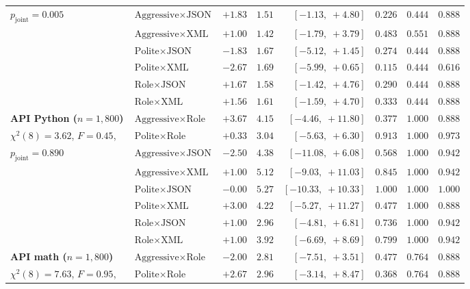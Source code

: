 \documentclass[a4paper,fleqn]{cas-sc}
\begin{document}
\begin{table}[htbp]
\begin{tabular}{@{}llrrrrrr@{}}
$p_{\text{joint}} = 0.005$ & $\text{Aggressive} \times \text{JSON}$ & $+1.83$ & $1.51$ & $[-1.13,\; +4.80]$ & $0.226$ & $0.444$ & $0.888$ \\
 & $\text{Aggressive} \times \text{XML}$ & $+1.00$ & $1.42$ & $[-1.79,\; +3.79]$ & $0.483$ & $0.551$ & $0.888$ \\
 & $\text{Polite} \times \text{JSON}$ & $-1.83$ & $1.67$ & $[-5.12,\; +1.45]$ & $0.274$ & $0.444$ & $0.888$ \\
 & $\text{Polite} \times \text{XML}$ & $-2.67$ & $1.69$ & $[-5.99,\; +0.65]$ & $0.115$ & $0.444$ & $0.616$ \\
 & $\text{Role} \times \text{JSON}$ & $+1.67$ & $1.58$ & $[-1.42,\; +4.76]$ & $0.290$ & $0.444$ & $0.888$ \\
 & $\text{Role} \times \text{XML}$ & $+1.56$ & $1.61$ & $[-1.59,\; +4.70]$ & $0.333$ & $0.444$ & $0.888$ \\
\midrule
\textbf{API Python ($n = 1,800$)} & $\text{Aggressive} \times \text{Role}$ & $+3.67$ & $4.15$ & $[-4.46,\; +11.80]$ & $0.377$ & $1.000$ & $0.888$ \\
$\chi^2(8) = 3.62$, $F = 0.45$, & $\text{Polite} \times \text{Role}$ & $+0.33$ & $3.04$ & $[-5.63,\; +6.30]$ & $0.913$ & $1.000$ & $0.973$ \\
$p_{\text{joint}} = 0.890$ & $\text{Aggressive} \times \text{JSON}$ & $-2.50$ & $4.38$ & $[-11.08,\; +6.08]$ & $0.568$ & $1.000$ & $0.942$ \\
 & $\text{Aggressive} \times \text{XML}$ & $+1.00$ & $5.12$ & $[-9.03,\; +11.03]$ & $0.845$ & $1.000$ & $0.942$ \\
 & $\text{Polite} \times \text{JSON}$ & $-0.00$ & $5.27$ & $[-10.33,\; +10.33]$ & $1.000$ & $1.000$ & $1.000$ \\
 & $\text{Polite} \times \text{XML}$ & $+3.00$ & $4.22$ & $[-5.27,\; +11.27]$ & $0.477$ & $1.000$ & $0.888$ \\
 & $\text{Role} \times \text{JSON}$ & $+1.00$ & $2.96$ & $[-4.81,\; +6.81]$ & $0.736$ & $1.000$ & $0.942$ \\
 & $\text{Role} \times \text{XML}$ & $+1.00$ & $3.92$ & $[-6.69,\; +8.69]$ & $0.799$ & $1.000$ & $0.942$ \\
\midrule
\textbf{API math ($n = 1,800$)} & $\text{Aggressive} \times \text{Role}$ & $-2.00$ & $2.81$ & $[-7.51,\; +3.51]$ & $0.477$ & $0.764$ & $0.888$ \\
$\chi^2(8) = 7.63$, $F = 0.95$, & $\text{Polite} \times \text{Role}$ & $+2.67$ & $2.96$ & $[-3.14,\; +8.47]$ & $0.368$ & $0.764$ & $0.888$ \\

\end{tabular}
\end{table}
\end{document}
